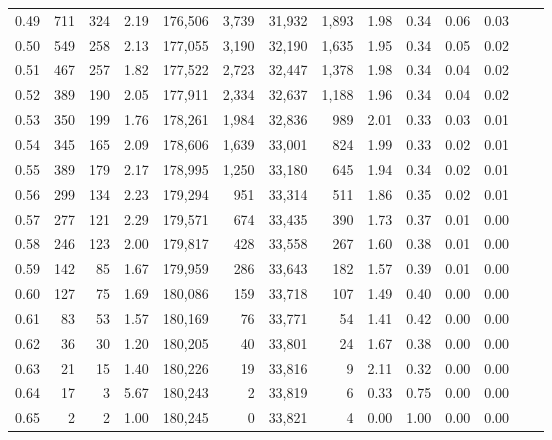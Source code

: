 \begin{tabular}{rrrrrrrrrrrrrr}
0.49 &    711 &    324 &    2.19 &  176,506 &    3,739 &  31,932 &   1,893 &  1.98 &  0.34 &  0.06 &      0.03 \\
0.50 &    549 &    258 &    2.13 &  177,055 &    3,190 &  32,190 &   1,635 &  1.95 &  0.34 &  0.05 &      0.02 \\
0.51 &    467 &    257 &    1.82 &  177,522 &    2,723 &  32,447 &   1,378 &  1.98 &  0.34 &  0.04 &      0.02 \\
0.52 &    389 &    190 &    2.05 &  177,911 &    2,334 &  32,637 &   1,188 &  1.96 &  0.34 &  0.04 &      0.02 \\
0.53 &    350 &    199 &    1.76 &  178,261 &    1,984 &  32,836 &     989 &  2.01 &  0.33 &  0.03 &      0.01 \\
0.54 &    345 &    165 &    2.09 &  178,606 &    1,639 &  33,001 &     824 &  1.99 &  0.33 &  0.02 &      0.01 \\
0.55 &    389 &    179 &    2.17 &  178,995 &    1,250 &  33,180 &     645 &  1.94 &  0.34 &  0.02 &      0.01 \\
0.56 &    299 &    134 &    2.23 &  179,294 &      951 &  33,314 &     511 &  1.86 &  0.35 &  0.02 &      0.01 \\
0.57 &    277 &    121 &    2.29 &  179,571 &      674 &  33,435 &     390 &  1.73 &  0.37 &  0.01 &      0.00 \\
0.58 &    246 &    123 &    2.00 &  179,817 &      428 &  33,558 &     267 &  1.60 &  0.38 &  0.01 &      0.00 \\
0.59 &    142 &     85 &    1.67 &  179,959 &      286 &  33,643 &     182 &  1.57 &  0.39 &  0.01 &      0.00 \\
0.60 &    127 &     75 &    1.69 &  180,086 &      159 &  33,718 &     107 &  1.49 &  0.40 &  0.00 &      0.00 \\
0.61 &     83 &     53 &    1.57 &  180,169 &       76 &  33,771 &      54 &  1.41 &  0.42 &  0.00 &      0.00 \\
0.62 &     36 &     30 &    1.20 &  180,205 &       40 &  33,801 &      24 &  1.67 &  0.38 &  0.00 &      0.00 \\
0.63 &     21 &     15 &    1.40 &  180,226 &       19 &  33,816 &       9 &  2.11 &  0.32 &  0.00 &      0.00 \\
0.64 &     17 &      3 &    5.67 &  180,243 &        2 &  33,819 &       6 &  0.33 &  0.75 &  0.00 &      0.00 \\
0.65 &      2 &      2 &    1.00 &  180,245 &        0 &  33,821 &       4 &  0.00 &  1.00 &  0.00 &      0.00 \\

\end{tabular}
